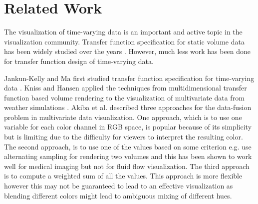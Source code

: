 \section{Related Work}
The visualization of time-varying data is an important and active topic in the visualization community. Transfer function specification for static volume data has been widely studied over the years \cite{pfister_transfer_2001}. However, much less work has been done for transfer function design of time-varying data.

Jankun-Kelly and Ma first studied transfer function specification for time-varying data \cite{jankun-kelly_study_2001}.
Kniss and Hansen applied the techniques from multidimensional transfer function based volume rendering to the visualization of multivariate data from weather simulations \cite{kniss_volume_2002}.
Akiba et al. \cite{akiba_visualizing_2007} described three approaches for the data-fusion problem in multivariate data visualization.
One approach, which is to use one variable for each color channel in RGB space, is popular because of its simplicity but is limiting due to the difficulty for viewers to interpret the resulting color.
The second approach, is to use one of the values based on some criterion e.g. \cite{hastreiter_integrated_1998}
use alternating sampling for rendering two volumes and this has been shown to work well for medical imaging but not for fluid flow visualization.
The third approach is to compute a weighted sum of all the values. This approach is more flexible however this may not be guaranteed to lead to an effective visualization as blending different colors might lead to ambiguous mixing of different hues.

